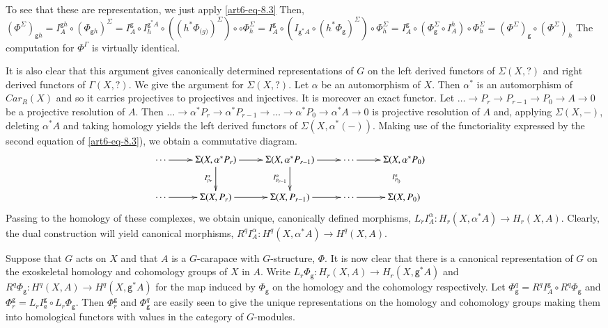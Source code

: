 To see that these are representation, we just apply \ref{art6-eq-8.3} Then, $(\Phi^{\Sigma})_{\mathsf{g}h} = I_{A}^{\mathsf{g} h} \circ (\Phi_{\mathsf{g} h})^{\Sigma} = I_{A}^{\mathsf{g}} \circ I_{h}^{\mathsf{g}^{*} A}
\circ ((h^{*} \Phi_{\mathsf(g)})^{\Sigma}) \circ \circ \Phi_{h}^{\Sigma} = I_{A}^{\mathsf{g}} \circ (I_{\mathsf{g}^{*} A} \circ (h^{*} \Phi_{\mathsf{g}})^{\Sigma}) \circ \Phi_{h}^{\Sigma} = I_{A}^{\mathsf{g}} \circ (\Phi_{\mathsf{g}}^{\Sigma} \circ I_{A}^{h}) \circ \Phi_{h}^{\Sigma} = (\Phi^{\Sigma})_{\mathsf{g}} \circ (\Phi^{\Sigma})_{h}$ The computation for $\Phi^{\Gamma}$ is virtually identical.

It is also clear that this argument gives canonically determined representations of $G$ on the left derived functors of $\Sigma(X, ?)$ and right derived functors of $\Gamma(X, ?)$. We give the argument for $\Sigma(X, ?)$. Let $\alpha$ be an automorphism of $X$. Then $\alpha^{*}$ is an automorphism of $Car_{R}(X)$ and so it carries projectives to projectives and injectives. It is moreover an exact functor. Let $\ldots \rightarrow P_{r} \rightarrow P_{r-1} \rightarrow P_{0}\rightarrow  A \rightarrow 0$ be a projective resolution of $A$. Then $\ldots  \rightarrow \alpha^{*}P_{r} \rightarrow \alpha^{*}P_{r-1} \rightarrow \ldots \rightarrow \alpha^{*}P_{0} \rightarrow \alpha^{*}A \rightarrow 0$ is projective resolution of $A$ and, applying $\Sigma(X, -)$, deleting $\alpha^{*}A $ and taking homology yields the left derived functors of $\Sigma(X, \alpha^{*}(-))$. Making use of the functoriality expressed by the second equation of \ref{art6-eq-8.3}), we obtain a commutative diagram.
$$
\xymatrix{
\cdots \ar[r] & \Sigma(X, \alpha^{*}P_{r})\ar[r]\ar[d]_{I_{p_{r}}^{\alpha}} &
\Sigma(X, \alpha^{*}P_{r-1})\ar[r]\ar[d]_{I_{p_{r-1}}^{\alpha}} & \cdots \ar[r]&\Sigma(X, \alpha^{*} P_{0})\ar@{}[d]_{I_{P_{0}}^{\alpha}}&\\
\cdots \ar[r] & \Sigma(X, P_{r})\ar[r] & \Sigma(X, P_{r-1})\ar[r] & \cdots \ar[r] &\Sigma(X, P_{0})&
}
$$
Passing to the homology of these complexes, we obtain unique, canonically defined morphisms, $L_{r}I_{A}^{\alpha}: H_{r}(X, \alpha^{*}A) \rightarrow H_{r}(X, A)$. Clearly, the dual construction will yield canonical morphisms, $R^{q}I_{A}^{\alpha} : H^{q}(X, \alpha^{*}A) \rightarrow H^{q}(X, A)$.

Suppose that $G$ acts on $X$ and that $A$ is a $G$-carapace with $G$-structure, $\Phi$. It is now clear that there is a canonical representation of $G$ on the exoskeletal homology and cohomology groups of $X$ in $A$. Write $L_{r}\Phi_{\mathsf{g}} : H_{r}(X, A) \rightarrow H_{r}(X, \mathsf{g}^{*} A)$ and $R^{q}\Phi_{\mathsf{g}} : H^{q}(X, A)\rightarrow H^{q}(X, \mathsf{g}^{*} A)$ for the map induced by $\Phi_{\mathsf{g}}$ on the homology and the cohomology respectively. Let $\Phi_{\mathsf{g}}^{q} = R^{q}I_{A}^{\mathsf{g}} \circ R^{q}\Phi_{\mathsf{g}}$ and $\Phi_{r}^{\mathsf{g}} = L_{r}I_{a}^{\mathsf{g}} \circ L_{r}\Phi_{\mathsf{g}}$. Then $\Phi_{r}^{\mathsf{g}}$ and $\Phi_{\mathsf{g}}^{q}$ are easily seen to give the unique representations on the homology and cohomology groups making them into homological functors with values in the category of $G$-modules.

